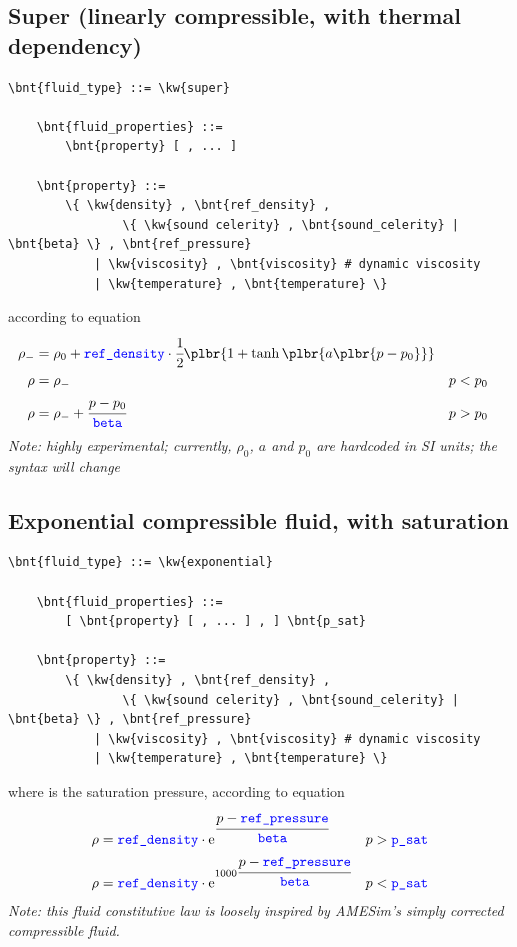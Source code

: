 \subsection{Super (linearly compressible, with thermal dependency)}
\begin{Verbatim}[commandchars=\\\{\}]
    \bnt{fluid_type} ::= \kw{super}

    \bnt{fluid_properties} ::= 
        \bnt{property} [ , ... ]

    \bnt{property} ::=
        \{ \kw{density} , \bnt{ref_density} ,
                \{ \kw{sound celerity} , \bnt{sound_celerity} | \bnt{beta} \} , \bnt{ref_pressure}
            | \kw{viscosity} , \bnt{viscosity} # dynamic viscosity
            | \kw{temperature} , \bnt{temperature} \}
\end{Verbatim}
according to equation
\begin{align}
	\rho_-
	&=
	\rho_0 + \nt{ref\_density} \cdot \cfrac{1}{2}\plbr{
		1 + \tanh\plbr{a\plbr{p - p_0}}
	}
	\nonumber \\
	\rho
	&=
	\rho_-
		& p &< p_0
	\\
	\rho
	&=
	\rho_- + \cfrac{p - p_0}{\nt{beta}}
		& p &> p_0
	\nonumber
\end{align}
\emph{Note: highly experimental; currently, $\rho_0$, $a$ and $p_0$
are hardcoded in SI units; the syntax will change}

\subsection{Exponential compressible fluid, with saturation}
\begin{Verbatim}[commandchars=\\\{\}]
    \bnt{fluid_type} ::= \kw{exponential}

    \bnt{fluid_properties} ::= 
        [ \bnt{property} [ , ... ] , ] \bnt{p_sat}

    \bnt{property} ::=
        \{ \kw{density} , \bnt{ref_density} ,
                \{ \kw{sound celerity} , \bnt{sound_celerity} | \bnt{beta} \} , \bnt{ref_pressure}
            | \kw{viscosity} , \bnt{viscosity} # dynamic viscosity
            | \kw{temperature} , \bnt{temperature} \}
\end{Verbatim}
where  is the saturation pressure, according to equation
\begin{align}
	\rho &= \textcolor{blue}{\texttt{ref\_density}} \cdot \text{e}^{\cfrac{p - \textcolor{blue}{\texttt{ref\_pressure}}}{\textcolor{blue}{\texttt{beta}}}}
		& p &> \textcolor{blue}{\texttt{p\_sat}}
	\nonumber \\
	\rho &= \textcolor{blue}{\texttt{ref\_density}} \cdot \text{e}^{1000\cfrac{p - \textcolor{blue}{\texttt{ref\_pressure}}}{\textcolor{blue}{\texttt{beta}}}}
		& p &< \textcolor{blue}{\texttt{p\_sat}}
\end{align}
\emph{Note: this fluid constitutive law is loosely inspired by AMESim's
simply corrected compressible fluid.}



